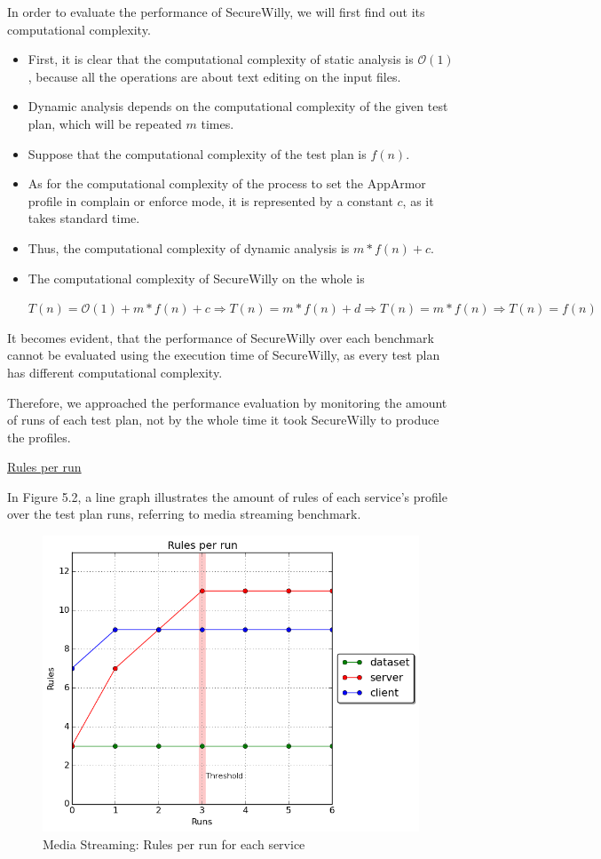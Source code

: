 In order to evaluate the performance of SecureWilly, we will first find out its computational complexity.

\begin{itemize}
\item First, it is clear that the computational complexity of static analysis is $\mathcal{O}(1)$, because all the operations are about text editing on the input files.
\item Dynamic analysis depends on the computational complexity of the given test plan, which will be repeated $m$ times.

\item Suppose that the computational complexity of the test plan is $f(n)$.

\item As for the computational complexity of the process to set the AppArmor profile in complain or enforce mode, it is represented by a constant $c$, as it takes standard time.

\item Thus, the computational complexity of dynamic analysis is $m*f(n) + c$.

\item The computational complexity of SecureWilly on the whole is

$T(n) = \mathcal{O}(1) + m*f(n) + c \Rightarrow T(n) = m*f(n) + d \Rightarrow T(n) = m*f(n) \Rightarrow T(n) = f(n)$

\end{itemize}

It becomes evident, that the performance of SecureWilly over each benchmark cannot be evaluated using the execution time of SecureWilly, as every test plan has different computational complexity.

Therefore, we approached the performance evaluation by monitoring the amount of runs of each test plan, not by the whole time it took SecureWilly to produce the profiles.

\hfill\break
\underline{Rules per run}
\hfill\break

In Figure 5.2, a line graph illustrates the amount of rules of each service's profile over the test plan runs, referring to media streaming benchmark.

\begin{figure}[h!]
  \centering
   \includegraphics[width=0.70\linewidth]{../figures/mediastreaming/rulesthreshold.png}
   \caption{Media Streaming: Rules per run for each service}
\end{figure}

